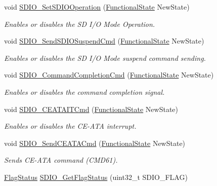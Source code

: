 \begin{DoxyCompactItemize}
void \hyperlink{group___s_d_i_o___private___functions_ga24e210c185d5a7855cbaff4472a8f8d1}{S\+D\+I\+O\+\_\+\+Set\+S\+D\+I\+O\+Operation} (\hyperlink{group___exported__types_gac9a7e9a35d2513ec15c3b537aaa4fba1}{Functional\+State} New\+State)
\begin{DoxyCompactList}\small\item\em Enables or disables the SD I/O Mode Operation. \end{DoxyCompactList}\item 
void \hyperlink{group___s_d_i_o___private___functions_ga9264137a01a1ab81d03bc80a3b3120fc}{S\+D\+I\+O\+\_\+\+Send\+S\+D\+I\+O\+Suspend\+Cmd} (\hyperlink{group___exported__types_gac9a7e9a35d2513ec15c3b537aaa4fba1}{Functional\+State} New\+State)
\begin{DoxyCompactList}\small\item\em Enables or disables the SD I/O Mode suspend command sending. \end{DoxyCompactList}\item 
void \hyperlink{group___s_d_i_o___private___functions_ga1bbe98c629812bc62121d9c8b2c5e21b}{S\+D\+I\+O\+\_\+\+Command\+Completion\+Cmd} (\hyperlink{group___exported__types_gac9a7e9a35d2513ec15c3b537aaa4fba1}{Functional\+State} New\+State)
\begin{DoxyCompactList}\small\item\em Enables or disables the command completion signal. \end{DoxyCompactList}\item 
void \hyperlink{group___s_d_i_o___private___functions_gab44b8cbc21be000a291563076159503b}{S\+D\+I\+O\+\_\+\+C\+E\+A\+T\+A\+I\+T\+Cmd} (\hyperlink{group___exported__types_gac9a7e9a35d2513ec15c3b537aaa4fba1}{Functional\+State} New\+State)
\begin{DoxyCompactList}\small\item\em Enables or disables the C\+E-\/\+A\+TA interrupt. \end{DoxyCompactList}\item 
void \hyperlink{group___s_d_i_o___private___functions_ga8dc7f17804bdb745b42f6647c8487b4c}{S\+D\+I\+O\+\_\+\+Send\+C\+E\+A\+T\+A\+Cmd} (\hyperlink{group___exported__types_gac9a7e9a35d2513ec15c3b537aaa4fba1}{Functional\+State} New\+State)
\begin{DoxyCompactList}\small\item\em Sends C\+E-\/\+A\+TA command (C\+M\+D61). \end{DoxyCompactList}\item 
\hyperlink{group___exported__types_ga89136caac2e14c55151f527ac02daaff}{Flag\+Status} \hyperlink{group___s_d_i_o___private___functions_ga644514b4b3c95c5c4326d99cd166f6f9}{S\+D\+I\+O\+\_\+\+Get\+Flag\+Status} (uint32\+\_\+t S\+D\+I\+O\+\_\+\+F\+L\+AG)

\end{DoxyCompactItemize}
